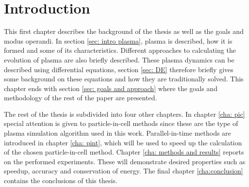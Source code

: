 \chapter{Introduction}
\label{cha: intro}



This first chapter describes the background of the thesis as well as the goals and modus operandi. In section \ref{sec: intro plasma}, plasma is described, how it is formed and some of its characteristics. Different approaches to calculating the evolution of plasma are also briefly described. 
These plasma dynamics can be described using differential equations, section \ref{sec: DE} therefore briefly gives some background on these equations and how they are traditionally solved. 
This chapter ends with section \ref{sec: goals and approach} where the goals and methodology of the rest of the paper are presented.

The rest of the thesis is subdivided into four other chapters. 
In chapter \ref{cha: pic} special attention is given to particle-in-cell methods since these are the type of plasma simulation algorithm used in this work.  
Parallel-in-time methods are introduced in chapter \ref{cha: pint}, which will be used to speed up the calculation of the chosen particle-in-cell method. 
Chapter \ref{cha: methods and results} reports on the performed experiments. These will demonstrate desired properties such as speedup, accuracy and conservation of energy. 
The final chapter \ref{cha:conclusion} contains the conclusions of this thesis.


